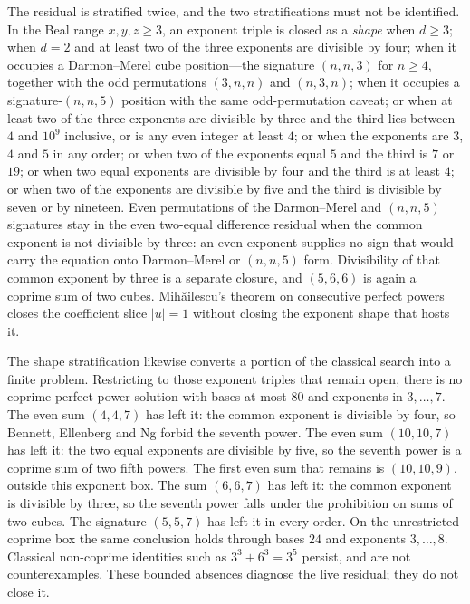 \documentclass[a4paper]{article}
\theoremstyle{definition}
\theoremstyle{remark}
\begin{document}
The residual is stratified twice, and the two stratifications must not be identified. In the Beal range \( x,y,z\ge 3 \), an exponent triple is closed as a \emph{shape} when \( d\ge 3 \); when \( d=2 \) and at least two of the three exponents are divisible by four; when it occupies a Darmon--Merel cube position---the signature \( (n,n,3) \) for \( n\ge 4 \), together with the odd permutations \( (3,n,n) \) and \( (n,3,n) \); when it occupies a signature-\( (n,n,5) \) position with the same odd-permutation caveat; or when at least two of the three exponents are divisible by three and the third lies between \( 4 \) and \( 10^9 \) inclusive, or is any even integer at least \( 4 \); or when the exponents are \( 3 \), \( 4 \) and \( 5 \) in any order; or when two of the exponents equal \( 5 \) and the third is \( 7 \) or \( 19 \); or when two equal exponents are divisible by four and the third is at least \( 4 \); or when two of the exponents are divisible by five and the third is divisible by seven or by nineteen. Even permutations of the Darmon--Merel and \( (n,n,5) \) signatures stay in the even two-equal difference residual when the common exponent is not divisible by three: an even exponent supplies no sign that would carry the equation onto Darmon--Merel or \( (n,n,5) \) form. Divisibility of that common exponent by three is a separate closure, and \( (5,6,6) \) is again a coprime sum of two cubes. Mihăilescu's theorem on consecutive perfect powers closes the coefficient slice \( |u|=1 \) without closing the exponent shape that hosts it.

The shape stratification likewise converts a portion of the classical search into a finite problem. Restricting to those exponent triples that remain open, there is no coprime perfect-power solution with bases at most \(80\) and exponents in \(3,\ldots,7\). The even sum \( (4,4,7) \) has left it: the common exponent is divisible by four, so Bennett, Ellenberg and Ng forbid the seventh power. The even sum \( (10,10,7) \) has left it: the two equal exponents are divisible by five, so the seventh power is a coprime sum of two fifth powers. The first even sum that remains is \( (10,10,9) \), outside this exponent box. The sum \( (6,6,7) \) has left it: the common exponent is divisible by three, so the seventh power falls under the prohibition on sums of two cubes. The signature \( (5,5,7) \) has left it in every order. On the unrestricted coprime box the same conclusion holds through bases \(24\) and exponents \(3,\ldots,8\). Classical non-coprime identities such as \(3^3+6^3=3^5\) persist, and are not counterexamples. These bounded absences diagnose the live residual; they do not close it.
\end{document}
